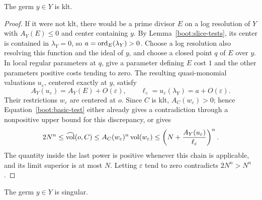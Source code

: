 \begin{lemma}
\label{boot:slice-klt}
The germ $y\in Y$ is klt.
\end{lemma}

\begin{proof}
If it were not klt, there would be a prime divisor $E$ on a log
resolution of $Y$ with $A_Y(E)\leq0$ and center containing $y$.
By Lemma~\ref{boot:slice-tests}, its center is contained in
$\lambda_Y=0$, so $a=\operatorname{ord}_E(\lambda_Y)>0$.  Choose a log
resolution also resolving this function and the ideal of $y$,
and choose a closed point $q$ of $E$ over $y$.  In local regular
parameters at $q$, give a parameter defining $E$ cost $1$ and the
other parameters positive costs tending to zero.  The resulting
quasi-monomial valuations $u_\varepsilon$, centered exactly at
$y$, satisfy
\[
 A_Y(u_\varepsilon)=A_Y(E)+O(\varepsilon),
 \qquad
 \ell_\varepsilon=u_\varepsilon(\lambda_Y)
                  =a+O(\varepsilon).
\]
Their restrictions $w_\varepsilon$ are centered at $o$.
Since $C$ is klt, $A_C(w_\varepsilon)>0$; hence
Equation~\eqref{boot:basic-test} either already gives a
contradiction through a nonpositive upper bound for this
discrepancy, or gives
\[
 2N^n\leq\widehat{\operatorname{vol}}(o,C)
 \leq A_C(w_\varepsilon)^n\operatorname{vol}(w_\varepsilon)
 \leq
 \left(N+
 \frac{A_Y(u_\varepsilon)}{\ell_\varepsilon}\right)^n.
\]
The quantity inside the last power is positive whenever this
chain is applicable, and its limit superior is at most $N$.
Letting $\varepsilon$ tend to zero contradicts $2N^n>N^n$.
\end{proof}

\begin{lemma}
\label{boot:slice-singular}
The germ $y\in Y$ is singular.
\end{lemma}

